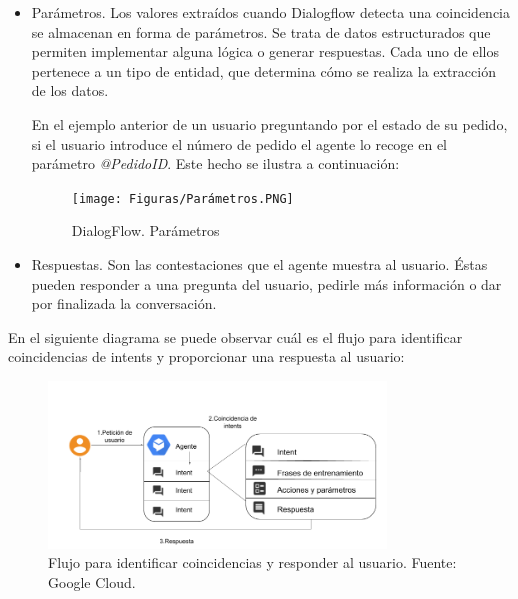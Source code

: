 \begin{itemize}
\begin{itemize}
         \newpage
         
         \item Parámetros. Los valores extraídos cuando Dialogflow detecta una coincidencia se almacenan en forma de parámetros. Se trata de datos estructurados que permiten implementar alguna lógica o generar respuestas. Cada uno de ellos pertenece a un tipo de entidad, que determina cómo se realiza la extracción de los datos. 

         En el ejemplo anterior de un usuario preguntando por el estado de su pedido, si el usuario introduce el número de pedido el agente lo recoge en el parámetro \textit{@PedidoID}. Este hecho se ilustra a continuación:
         
          \begin{figure}[ht]
             \begin{center}
                \texttt{[image: Figuras/Parámetros.PNG]}
             \end{center}
             \caption{\label{fig:DialogflowParams}DialogFlow. Parámetros}
          \end{figure}
         
         \item Respuestas. Son las contestaciones que el agente muestra al usuario. Éstas pueden responder a una pregunta del usuario, pedirle más información o dar por finalizada la conversación.
     \end{itemize}
     
     En el siguiente diagrama se puede observar cuál es el flujo para identificar coincidencias de intents y proporcionar una respuesta al usuario:
     
    
    
     
     \begin{figure}[ht]
         \begin{center}
            \includegraphics[width = 0.80\textwidth]{Figuras/FlujoCoincidencias.png}
         \end{center}
         \caption{\label{fig:FlujoCoincidencias}Flujo para identificar coincidencias y responder al usuario. Fuente: Google Cloud.}
     \end{figure}
     

\end{itemize}
